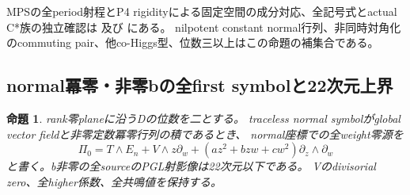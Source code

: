 \documentclass[a4paper,11pt]{ltjsarticle}
\newtheorem{proposition}{命題}[section]
\theoremstyle{definition}
\begin{document}
MPSの全period射程とP4 rigidityによる固定空間の成分対応、全記号式とactual C*族の独立確認は
及び
にある。
nilpotent constant normal行列、非同時対角化のcommuting pair、他co-Higgs型、位数三以上はこの命題の補集合である。

\subsection{normal冪零・非零bの全first symbolと22次元上界}
\begin{proposition}\label{prop:plane-global-nilpotent-nonzero-b-G}
rank零planeに沿うDの位数を二とする。
traceless normal symbolがglobal vector fieldと非零定数冪零行列の積であるとき、
normal座標での全weight零源を
\[
 \Pi_0=T\wedge E_n+V\wedge z\partial_w
       +(az^2+bzw+cw^2)\partial_z\wedge\partial_w
\]
と書く。b非零の全sourceのPGL射影像は22次元以下である。
Vのdivisorial zero、全higher係数、全共鳴値を保持する。
\end{proposition}
\end{document}
